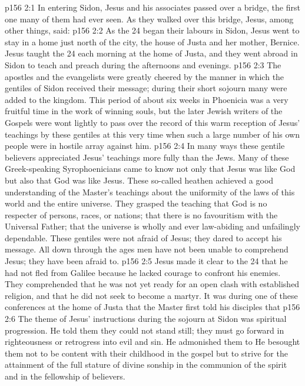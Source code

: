 \vs p156 2:1 In entering Sidon, Jesus and his associates passed over a bridge, the first one many of them had ever seen. As they walked over this bridge, Jesus, among other things, said: 
\vs p156 2:2 \pc As the 24 began their labours in Sidon, Jesus went to stay in a home just north of the city, the house of Justa and her mother, Bernice. Jesus taught the 24 each morning at the home of Justa, and they went abroad in Sidon to teach and preach during the afternoons and evenings.
\vs p156 2:3 The apostles and the evangelists were greatly cheered by the manner in which the gentiles of Sidon received their message; during their short sojourn many were added to the kingdom. This period of about six weeks in Phoenicia was a very fruitful time in the work of winning souls, but the later Jewish writers of the Gospels were wont lightly to pass over the record of this warm reception of Jesus’ teachings by these gentiles at this very time when such a large number of his own people were in hostile array against him.
\vs p156 2:4 In many ways these gentile believers appreciated Jesus’ teachings more fully than the Jews. Many of these Greek\hyp{}speaking Syrophoenicians came to know not only that Jesus was like God but also that God was like Jesus. These so\hyp{}called heathen achieved a good understanding of the Master’s teachings about the uniformity of the laws of this world and the entire universe. They grasped the teaching that God is no respecter of persons, races, or nations; that there is no favouritism with the Universal Father; that the universe is wholly and ever law\hyp{}abiding and unfailingly dependable. These gentiles were not afraid of Jesus; they dared to accept his message. All down through the ages men have not been unable to comprehend Jesus; they have been afraid to.
\vs p156 2:5 \pc Jesus made it clear to the 24 that he had not fled from Galilee because he lacked courage to confront his enemies. They comprehended that he was not yet ready for an open clash with established religion, and that he did not seek to become a martyr. It was during one of these conferences at the home of Justa that the Master first told his disciples that 
\vs p156 2:6 \pc The theme of Jesus’ instructions during the sojourn at Sidon was spiritual progression. He told them they could not stand still; they must go forward in righteousness or retrogress into evil and sin. He admonished them to  He besought them not to be content with their childhood in the gospel but to strive for the attainment of the full stature of divine sonship in the communion of the spirit and in the fellowship of believers.
